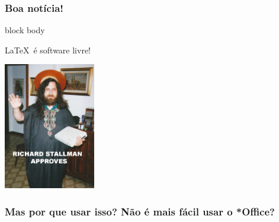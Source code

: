 \documentclass{beamer}
\begin{document}
\begin{frame}
   \frametitle{Boa notícia!}
   \begin{center}
      \begin{minipage}{5cm}
        \begin{beamercolorbox}[sep=1em,wd=5cm]{block body}
            \begin{center}
               \LaTeX\ é software livre!
            \end{center}
        \end{beamercolorbox}
      \end{minipage}
      \begin{minipage}{5cm}
         \begin{center}
            \includegraphics[width=4cm]{img/saintignuciuscopia.jpg}
         \end{center}
      \end{minipage}
   \end{center}
\end{frame}
\begin{frame}
   \frametitle{Mas por que usar isso? Não é mais fácil usar o *Office?}
   \begin{center}
      \noindent{}
   \end{center}
\end{frame}
\end{document}
